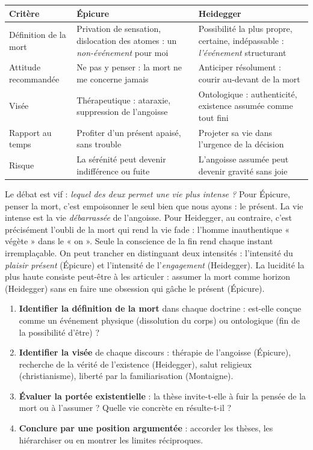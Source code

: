 \documentclass[11pt]{article}
\begin{document}
\begin{center}
\begin{tabularx}{\linewidth}{|l|X|X|}
\hline
\rowcolor{popblueL} \textbf{Critère} & \textbf{Épicure} & \textbf{Heidegger} \\
\hline
Définition de la mort & Privation de sensation, dislocation des atomes : un \emph{non-événement} pour moi & Possibilité la plus propre, certaine, indépassable : \emph{l'événement} structurant \\
\hline
Attitude recommandée & Ne pas y penser : la mort ne me concerne jamais & Anticiper résolument : courir au-devant de la mort \\
\hline
Visée & Thérapeutique : ataraxie, suppression de l'angoisse & Ontologique : authenticité, existence assumée comme tout fini \\
\hline
Rapport au temps & Profiter d'un présent apaisé, sans trouble & Projeter sa vie dans l'urgence de la décision \\
\hline
Risque & La sérénité peut devenir indifférence ou fuite & L'angoisse assumée peut devenir gravité sans joie \\
\hline
\end{tabularx}
\end{center}

Le débat est vif : \emph{lequel des deux permet une vie plus intense ?} Pour Épicure, penser la mort, c'est empoisonner le seul bien que nous ayons : le présent. La vie intense est la vie \emph{débarrassée} de l'angoisse. Pour Heidegger, au contraire, c'est précisément l'oubli de la mort qui rend la vie fade : l'homme inauthentique « végète » dans le « on ». Seule la conscience de la fin rend chaque instant irremplaçable. On peut trancher en distinguant deux intensités : l'intensité du \emph{plaisir présent} (Épicure) et l'intensité de l'\emph{engagement} (Heidegger). La lucidité la plus haute consiste peut-être à les articuler : assumer la mort comme horizon (Heidegger) sans en faire une obsession qui gâche le présent (Épicure).

\begin{methode}
\begin{enumerate}
\item \textbf{Identifier la définition de la mort} dans chaque doctrine : est-elle conçue comme un événement physique (dissolution du corps) ou ontologique (fin de la possibilité d'être) ?
\item \textbf{Identifier la visée} de chaque discours : thérapie de l'angoisse (Épicure), recherche de la vérité de l'existence (Heidegger), salut religieux (christianisme), liberté par la familiarisation (Montaigne).
\item \textbf{Évaluer la portée existentielle} : la thèse invite-t-elle à fuir la pensée de la mort ou à l'assumer ? Quelle vie concrète en résulte-t-il ?
\item \textbf{Conclure par une position argumentée} : accorder les thèses, les hiérarchiser ou en montrer les limites réciproques.
\end{enumerate}
\end{methode}
\end{document}
